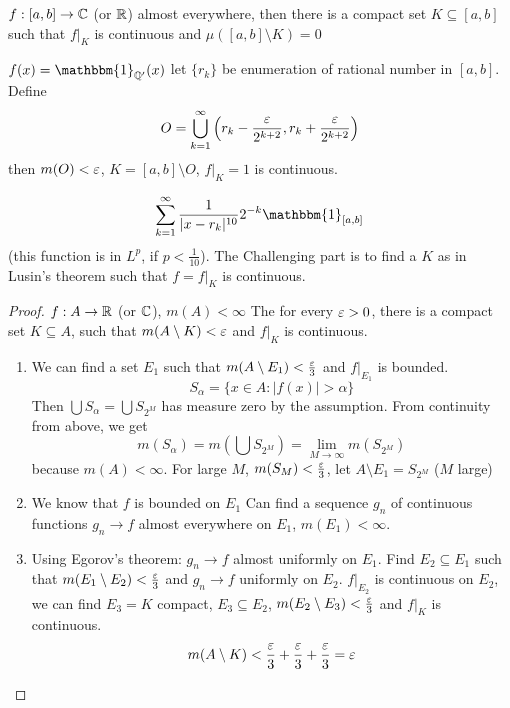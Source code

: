 \begin{theorem}
  $f:[a, b] \to \mathbb C$ (or $\mathbb R$) almost everywhere, 
  then there is a compact set $K \subseteq [a, b]$ such that $f|_K$ is continuous and $\mu([a, b] \setminus K) = 0$
\end{theorem}

\begin{example}
  $f(x) = \mathbbm{1}_{\QQ'}(x)$
  let $\{r_k\}$ be enumeration of rational number in $[a, b]$. Define
  \[O = \bigcup_{k=1}^\infty \left(r_k - \frac{\varepsilon}{2^{k+2}}, r_k + \frac{\varepsilon}{2^{k+2}}\right)\]
  then $m(O) < \varepsilon$, $K = [a, b] \setminus O$, $f|_K = 1$ is continuous.
\end{example}

\begin{example}
  \[\sum_{k=1}^\infty \frac1{|x - r_k|^{10}}2^{-k} \mathbbm{1}_{[a, b]}\]
  (this function is in $L^p$, if $p < \frac1{10}$).
  The Challenging part is to find a $K$ as in Lusin's theorem such that
  $f = f|_K$ is continuous.
\end{example}

\begin{proof}
$f: A \to \mathbb R$ (or $\mathbb C$), $m(A) < \infty$
The for every $\varepsilon > 0$, there is a compact set $K \subseteq A$, such that 
$m(A \setminus K) < \varepsilon$ and $f|_K$ is continuous.

\begin{enumerate}
  \item We can find a set $E_1$ such that $m(A\setminus E_1) < \frac{\varepsilon}3$ and $f|_{E_1}$ is bounded.
  \[S_\alpha = \{x \in A : |f(x)| > \alpha\}\]
  Then $\bigcup S_\alpha = \bigcup S_{2^M}$ has measure zero by the assumption. From continuity from above, we get
  \[m(S_\alpha) = m\left(\bigcup S_{2^M}\right) = \lim_{M\to\infty}m(S_{2^M})\]
  because $m(A) < \infty$. For large $M$, $m(S_M) < \frac{\varepsilon}3$, let $A \setminus E_1 = S_{2^M}$ ($M$ large)
  \item We know that $f$ is bounded on $E_1$
  Can find a sequence $g_n$ of continuous functions $g_n \to f$ almost everywhere on $E_1$, $m(E_1) < \infty$.
  \item Using Egorov's theorem: $g_n \to f$ almost uniformly on $E_1$.
  Find $E_2 \subseteq E_1$ such that $m(E_1 \setminus E_2) < \frac{\varepsilon}3$ and $g_n \to f$ uniformly on $E_2$.
  $f|_{E_2}$ is continuous on $E_2$, we can find $E_3 = K$ compact, $E_3 \subseteq E_2$, 
  $m(E_2 \setminus E_3) < \frac{\varepsilon}3$ and $f|_K$ is continuous.
  \[m(A\setminus K) < \frac{\varepsilon}3 + \frac{\varepsilon}3 + \frac{\varepsilon}3 = \varepsilon\]
\end{enumerate}
\end{proof}


